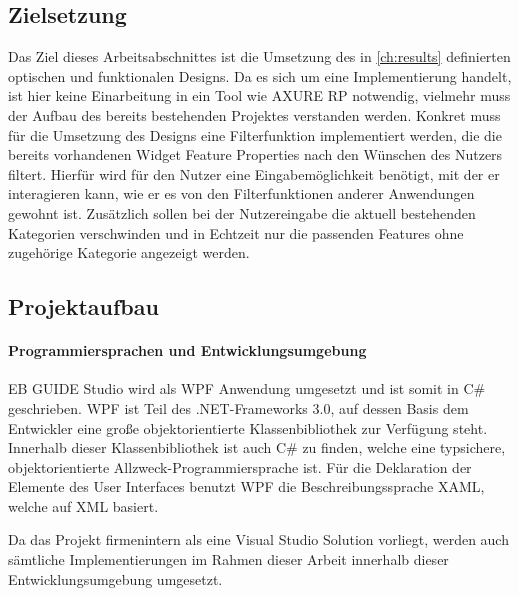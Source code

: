 \subsection {Zielsetzung}
Das Ziel dieses Arbeitsabschnittes ist die Umsetzung des in \cref{ch:results} definierten optischen und funktionalen Designs.
Da es sich um eine Implementierung handelt, ist hier keine Einarbeitung in ein Tool wie AXURE RP notwendig, vielmehr muss der Aufbau des bereits bestehenden Projektes verstanden werden.
Konkret muss für die Umsetzung des Designs eine Filterfunktion implementiert werden, die die bereits vorhandenen Widget Feature Properties nach den Wünschen des Nutzers filtert.
Hierfür wird für den Nutzer eine Eingabemöglichkeit benötigt, mit der er interagieren kann, wie er es von den Filterfunktionen anderer Anwendungen gewohnt ist.
Zusätzlich sollen bei der Nutzereingabe die aktuell bestehenden Kategorien verschwinden und in Echtzeit nur die passenden Features ohne zugehörige Kategorie angezeigt werden.

\subsection {Projektaufbau}

\paragraph{Programmiersprachen und Entwicklungsumgebung}
EB GUIDE Studio wird als WPF Anwendung umgesetzt und ist somit in C\# geschrieben.
WPF ist Teil des .NET-Frameworks 3.0, auf dessen Basis dem Entwickler eine große objektorientierte Klassenbibliothek zur Verfügung steht.
Innerhalb dieser Klassenbibliothek ist auch C\# zu finden, welche eine typsichere, objektorientierte Allzweck-Programmiersprache ist.
Für die Deklaration der Elemente des User Interfaces benutzt WPF die Beschreibungssprache XAML, welche auf XML basiert.

Da das Projekt firmenintern als eine Visual Studio Solution vorliegt, werden auch sämtliche Implementierungen im Rahmen dieser Arbeit innerhalb dieser Entwicklungsumgebung umgesetzt.

